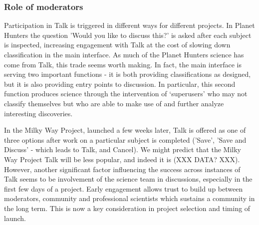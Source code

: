 \documentclass{sigchi}
\begin{document}
\subsubsection{Role of moderators}
Participation in Talk is triggered in different ways for different projects. In Planet Hunters the question 'Would you like to discuss this?' is asked after each subject is inspected, increasing engagement with Talk at the cost of slowing down classification in the main interface. As much of the Planet Hunters science has come from Talk, this trade seems worth making. In fact, the main interface is serving two important functions - it is both providing classifications as designed, but it is also providing entry points to discussion. In particular, this second function produces science through the intervention of `superusers' who may not classify themselves but who are able to make use of and further analyze interesting discoveries. 

In the Milky Way Project, launched a few weeks later, Talk is offered as one of three options after work on a particular subject is completed ('Save', 'Save and Discuss' - which leads to Talk, and Cancel). We might predict that the Milky Way Project Talk will be less popular, and indeed it is (XXX DATA? XXX). However, another significant factor influencing the success across instances of Talk seems to be involvement of the science team in discussions, especially in the first few days of a project. Early engagement allows trust to build up between moderators, community and professional scientists which sustains a community in the long term. This is now a key consideration in project selection and timing of launch. 

\end{document}
